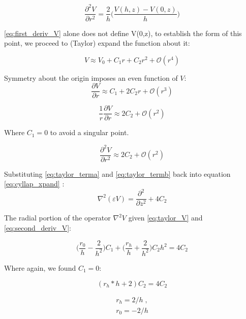 \begin{equation}\label{eq:second_deriv_V}
	\frac{\partial^2 V}{\partial r^2} = \frac{2}{h}\bigg(\frac{V(h,z) -  V(0, z) }{h}\bigg) 
\end{equation}

\autoref{eq:first_deriv_V} alone does not define V(0,z), to establish the form of this point, we proceed to (Taylor) expand the function about it:

\begin{equation}\label{eq:taylor_V}
 V \approx V_0  + C_1 r +  C_2 r^{2} + \mathcal{O}(r^4) 
\end{equation}

Symmetry about the origin imposes an even function of $V$:  
$$ \frac{\partial V}{\partial r} \approx C_1 +  2 C_2 r  + \mathcal{O}(r^3) $$

\begin{equation}\label{eq:taylor_terma}
	\frac{1}{r} \frac{\partial V}{\partial r} \approx  2 C_2  + \mathcal{O}(r^2)
\end{equation}

Where $C_1 = 0$ to avoid a singular point.

\begin{equation}\label{eq:taylor_termb}
	\frac{\partial^2 V}{\partial r^2} \approx 2 C_2 + \mathcal{O}(r^2) 
\end{equation}

Substituting \autoref{eq:taylor_terma} and \autoref{eq:taylor_termb} back into equation \autoref{eq:cyllap_xpand} :
\begin{equation}
    \nabla^2 (\varepsilon V)= \frac{\partial^2}{\partial z^2} + 4 C_2 
\end{equation}

The radial portion of the operator $\nabla^2 V$ given \autoref{eq:taylor_V} and \autoref{eq:second_deriv_V}:

\begin{equation}
\bigg(\frac{r_0}{h} - \frac{2}{h^2} \bigg) C_1 + \bigg(\frac{r_h}{h} + \frac{2}{h^2} \bigg) C_2 h^2 = 4 C_2
\end{equation}

Where again, we found $C_1 = 0$:

$$
(r_h * h + 2) C_2 = 4 C_2
$$

\begin{equation}
    \begin{aligned}
	r_h = 2 / h  \; , \\
	r_0 = -2 / h
    \end{aligned}
\end{equation}


